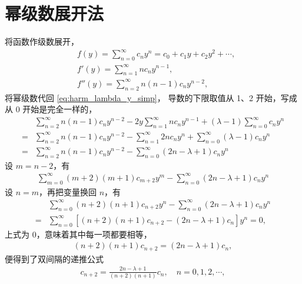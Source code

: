 \section{幂级数展开法}
将函数作级数展开，
\begin{align}
    &f(y) = \sum_{n=0}^\infty c_n y^n = c_0 + c_1 y + c_2 y^2 + \cdots,\\
    &f'(y) = \sum_{n=1}^\infty n c_n y^{n-1}, \\
    &f''(y) = \sum_{n=2}^\infty n(n-1) c_n y^{n-2},
\end{align}
将幂级数代回 \eqref{eq:harm_lambda_y_simp}，
导数的下限取值从 1、2 开始，写成从 0 开始是完全一样的，
\begin{align}
    & \sum_{n=2}^{\infty} n(n-1) c_n y^{n-2}-2 y \sum_{n=1}^{\infty} n c_n y^{n-1}+(\lambda-1) \sum_{n=0}^{\infty} c_n y^n \\
    =& \sum_{n=2}^{\infty} n(n-1) c_n y^{n-2}-\sum_{n=1}^{\infty} 2 n c_n y^n+\sum_{n=0}^{\infty}(\lambda-1) c_n y^n \\
    =& \sum_{n=2}^{\infty} n(n-1) c_n y^{n-2}-\sum_{n=0}^{\infty}(2 n-\lambda+1) c_n y^n
\end{align}
设 $m=n-2$，有
\begin{align}
    \sum_{m=0}^{\infty}(m+2)(m+1) c_{m+2} y^m-\sum_{n=0}^{\infty}(2 n-\lambda+1) c_n y^n
\end{align}
设 $n=m$，再把变量换回 $n$，有
\begin{align}
    &\sum_{n=0}^{\infty}(n+2)(n+1) c_{n+2} y^n-\sum_{n=0}^{\infty}(2 n-\lambda+1) c_n y^n \\
    ={}&\sum_{n=0}^{\infty}\left[(n+2)(n+1) c_{n+2}-(2 n-\lambda+1) c_n\right] y^n = 0, 
\end{align}
上式为 0，意味着其中每一项都要相等，
\begin{align}
    (n+2)(n+1) c_{n+2} = (2n - \lambda + 1)c_n,
\end{align}
便得到了双间隔的递推公式
\begin{align}
    c_{n+2} = \frac{2n - \lambda + 1}{(n+2)(n+1)} c_n, \quad n = 0, 1,2, \cdots,
\end{align}

